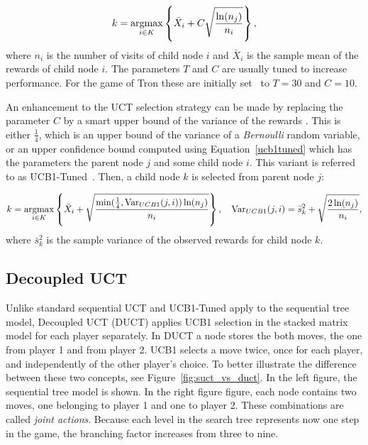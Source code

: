 \documentclass{article}
\newcommand{\argmax}{\operatornamewithlimits{argmax}}
\begin{document}
\begin{equation}\label{uct}
  k = \argmax_{i \in K} \left\{ \bar{X}_{i} + C \sqrt{\frac{\ln (n_{j})}{n_{i}}} \right\},
\end{equation}
where $n_{i}$ is the number of visits of child node $i$ and $\bar{X}_{i}$ is the sample mean of the rewards of child node $i$. 
The parameters $T$ and $C$ are usually tuned to increase performance. 
For the game of Tron these are initially set~\cite{teuling_tron} to $T=30$ and $C=10$.


An enhancement to the UCT selection strategy can be made by replacing the parameter $C$ by a smart upper bound of the variance of the rewards \cite{cig_paper}. This is either $\frac{1}{4}$, which is an upper bound of the variance of a \emph{Bernoulli} random variable, or an upper confidence bound computed using Equation~\ref{ucb1tuned} which has the parameters the parent node $j$ and some child node $i$.
This variant is referred to as UCB1-Tuned~\cite{auer_et_al}.
Then, a child node $k$ is selected from parent node $j$:

\begin{equation}\label{ucb1tuned}
k = \argmax_{i \in K} \left\{ \bar{X}_{i} + \sqrt{\frac{\min(\frac{1}{4},\mbox{Var}_{UCB1}(j,i)) \ln (n_{j})}{n_{i}}} \right\}, 
\mbox{ \hspace{0.1cm} } 
\mbox{Var}_{UCB1}(j,i)=\bar{s} ^2_{k}+\sqrt{\frac{2 \ln (n_{j})}{n_{i}}},
\end{equation}
where $\bar{s} ^2_{k}$ is the sample variance of the observed rewards for child node $k$. 


\subsection{Decoupled UCT}
\label{subsec:duct}

Unlike standard sequential UCT and UCB1-Tuned apply to the sequential tree model, Decoupled UCT (DUCT) applies UCB1 selection in the stacked matrix model for each player separately.
In DUCT a node stores the both moves, the one from player 1 and from player 2. 
UCB1 selects a move twice, once for each player, and independently of the other player's choice.  
To better illustrate the difference between these two concepts, see Figure~\ref{fig:suct_vs_duct}. In the left figure, the sequential tree model is shown. In the right figure figure, each node contains two moves, one belonging to player 1 and one to player 2. These combinations are called {\it joint actions}. Because each level in the search tree represents now one step in the game, the branching factor increases from three to nine.
\end{document}

